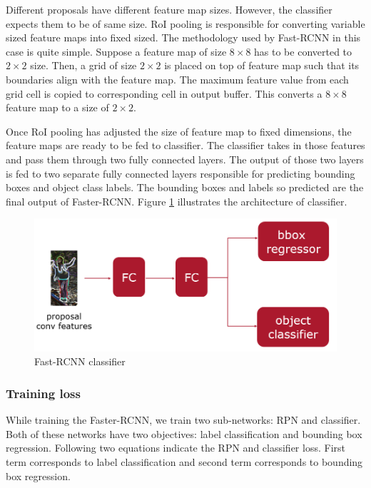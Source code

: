 Different proposals have different feature map sizes. However, the classifier expects them to be of same size. RoI pooling is responsible for converting variable sized feature maps into fixed sized. The methodology used by Fast-RCNN in this case is quite simple. Suppose a feature map of size $8\times 8$ has to be converted to $2 \times 2$ size. Then, a grid of size $2 \times 2$ is placed on top of feature map such that its boundaries align with the feature map. The maximum feature value from each grid cell is copied to corresponding cell in output buffer. This converts a $8\times 8$ feature map to a size of $2 \times 2$.

Once RoI pooling has adjusted the size of feature map to fixed dimensions, the feature maps are ready to be fed to classifier. The classifier takes in those features and pass them through two fully connected layers. The output of those two layers is fed to two separate fully connected layers responsible for predicting bounding boxes and object class labels. The bounding boxes and labels so predicted are the final output of Faster-RCNN. Figure \ref{fig:classifier} illustrates the architecture of classifier.

\begin{figure}
    \centering
    \includegraphics[width=\linewidth]{images/classifier.PNG}
    \caption{Fast-RCNN classifier}
    \label{fig:classifier}
\end{figure}

\subsubsection{Training loss}
While training the Faster-RCNN, we train two sub-networks: RPN and classifier. Both of these networks have two objectives: label classification and bounding box regression. Following two equations indicate the RPN and classifier loss. First term corresponds to label classification and second term corresponds to bounding box regression. 

